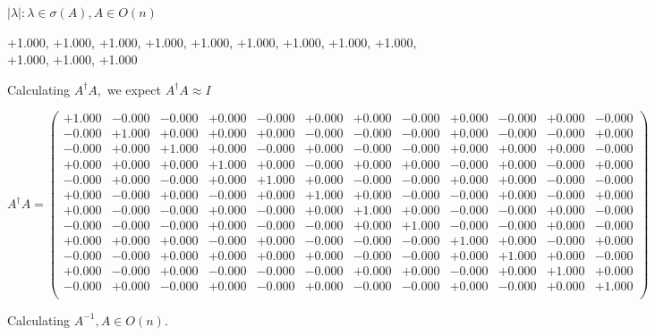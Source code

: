\documentclass[9pt]{article}
\theoremstyle{plain}
\theoremstyle{definition}
\theoremstyle{remark}
\numberwithin{equation}{section}
\begin{document}
 $|\lambda | : \lambda \in \sigma(A) , A \in O(n)$

+1.000, +1.000, +1.000, +1.000, +1.000, +1.000, +1.000, +1.000, +1.000, +1.000, +1.000, +1.000


Calculating $A^{\dag} A,$  we expect $A^{\dag} A \approx I$

$A^{\dag} A = \left(
\begin{array}{
cccccccccccc}
+1.000 & -0.000 & -0.000 & +0.000 & -0.000 & +0.000 & +0.000 & -0.000 & +0.000 & -0.000 & +0.000 & -0.000 \\
-0.000 & +1.000 & +0.000 & +0.000 & +0.000 & -0.000 & -0.000 & -0.000 & +0.000 & -0.000 & -0.000 & +0.000 \\
-0.000 & +0.000 & +1.000 & +0.000 & -0.000 & +0.000 & -0.000 & -0.000 & +0.000 & +0.000 & +0.000 & -0.000 \\
+0.000 & +0.000 & +0.000 & +1.000 & +0.000 & -0.000 & +0.000 & +0.000 & -0.000 & +0.000 & -0.000 & +0.000 \\
-0.000 & +0.000 & -0.000 & +0.000 & +1.000 & +0.000 & -0.000 & -0.000 & +0.000 & +0.000 & -0.000 & -0.000 \\
+0.000 & -0.000 & +0.000 & -0.000 & +0.000 & +1.000 & +0.000 & -0.000 & -0.000 & +0.000 & -0.000 & +0.000 \\
+0.000 & -0.000 & -0.000 & +0.000 & -0.000 & +0.000 & +1.000 & +0.000 & -0.000 & -0.000 & +0.000 & -0.000 \\
-0.000 & -0.000 & -0.000 & +0.000 & -0.000 & -0.000 & +0.000 & +1.000 & -0.000 & -0.000 & +0.000 & -0.000 \\
+0.000 & +0.000 & +0.000 & -0.000 & +0.000 & -0.000 & -0.000 & -0.000 & +1.000 & +0.000 & -0.000 & +0.000 \\
-0.000 & -0.000 & +0.000 & +0.000 & +0.000 & +0.000 & -0.000 & -0.000 & +0.000 & +1.000 & +0.000 & -0.000 \\
+0.000 & -0.000 & +0.000 & -0.000 & -0.000 & -0.000 & +0.000 & +0.000 & -0.000 & +0.000 & +1.000 & +0.000 \\
-0.000 & +0.000 & -0.000 & +0.000 & -0.000 & +0.000 & -0.000 & -0.000 & +0.000 & -0.000 & +0.000 & +1.000 \\
\end{array}
\right)$ \newline 

Calculating $A^{-1} ,  A \in O(n)$.
\end{document}
